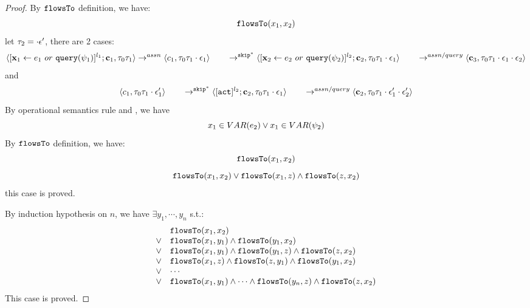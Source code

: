 \documentclass[a4paper,11pt]{article}
\begin{document}
\begin{proof}
%
By $\mathtt{flowsTo}$ definition, we have:
\[
\mathtt{flowsTo}(x_1, x_2)
\]
%
 let $\mathtt{\tau}_2 = \cdot \mathtt{\epsilon}'$, there are 2 cases:
\[
	\langle [\mathrel{ {\boldsymbol{\mathbf{x}}}_1 \leftarrow e_1~ or ~ {\tt query}(\psi_1) }]^{l_1} ; {\boldsymbol{\mathbf{c}}}_1, \mathtt{\tau}_0 \mathtt{\tau}_1 \rangle  \rightarrow^{assn}
\\ 
 \langle c_1, \mathtt{\tau}_0 \mathtt{\tau}_1 \cdot \mathtt{\epsilon}_1 \rangle 
  \qquad \rightarrow^{\mathtt{skip}^*} 
  \langle [\mathrel{ {\boldsymbol{\mathbf{x}}}_2 \leftarrow e_2 ~ or ~ {\tt query}(\psi_2) }]^{l_2};{\boldsymbol{\mathbf{c}}}_2, 
  \mathtt{\tau}_0 \mathtt{\tau}_1 \cdot \mathtt{\epsilon}_1 \rangle 
  \\
  \qquad \rightarrow^{assn/query} 
  \langle {\boldsymbol{\mathbf{c}}}_3,  \mathtt{\tau}_0 \mathtt{\tau}_1 \cdot \mathtt{\epsilon}_1\cdot \mathtt{\epsilon}_2 \rangle 
\]
and
\[
	 \langle c_1, \mathtt{\tau}_0 \mathtt{\tau}_1 \cdot \mathtt{\epsilon}_1' \rangle 
  \qquad \rightarrow^{\mathtt{skip}^*} 
  \langle [\mathtt{act}]^{l_2} ; {\boldsymbol{\mathbf{c}}}_2, \mathtt{\tau}_0 \mathtt{\tau}_1 \cdot \mathtt{\epsilon}_1 \rangle 
  \\
  \qquad \rightarrow^{assn/query} 
  \langle {\boldsymbol{\mathbf{c}}}_2,  \mathtt{\tau}_0 \mathtt{\tau}_1 \cdot \mathtt{\epsilon}_1' \cdot \mathtt{\epsilon}_2' \rangle 
\]
By operational semantics rule  and , we have 
\[
	x_1 \in VAR(e_2) \lor x_1 \in VAR(\psi_2)
\]
By $\mathtt{flowsTo}$ definition, we have:
\[
\mathtt{flowsTo}(x_1, x_2)
\]
\[
	\mathtt{flowsTo}(x_1, x_2) \lor \mathtt{flowsTo}(x_1, z) \land \mathtt{flowsTo}(z, x_2)
\]
this case is proved.

By induction hypothesis on $n$, we have $\exists y_1, \cdots, y_n$ s.t.:
\[
\begin{array}{ll}
			& \mathtt{flowsTo}(x_1, x_2) \\
	\lor 	& \mathtt{flowsTo}(x_1, y_1) \land \mathtt{flowsTo}(y_1, x_2)\\
	\lor 	& \mathtt{flowsTo}(x_1, y_1) \land \mathtt{flowsTo}(y_1, z) \land \mathtt{flowsTo}(z, x_2) \\
	\lor 	& \mathtt{flowsTo}(x_1, z) \land \mathtt{flowsTo}(z, y_1) \land \mathtt{flowsTo}(y_1, x_2) \\
	\lor 	& \cdots \\
	\lor 	& \mathtt{flowsTo}(x_1, y_1) \land \cdots \land \mathtt{flowsTo}(y_n, z) \land \mathtt{flowsTo}(z, x_2) \\
\end{array}
\]
This case is proved.
\end{proof}
\end{document}
